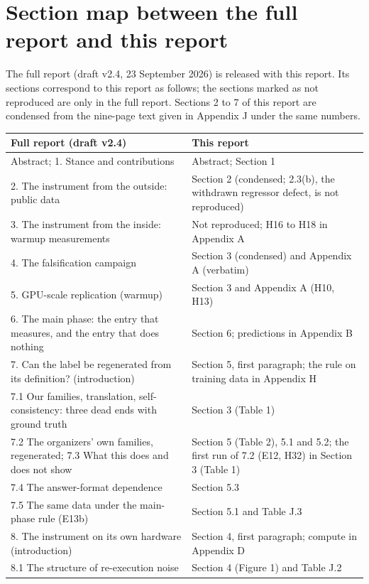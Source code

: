 \section{Section map between the full report and this report}\label{app:E}
The full report (draft v2.4, 23 September 2026) is released with this report. Its sections correspond to this report as follows; the sections marked as not reproduced are only in the full report. Sections 2 to 7 of this report are condensed from the nine-page text given in Appendix J under the same numbers.

\begin{center}\small\setlength{\tabcolsep}{4pt}
\begin{tabular}{L{7.4cm}L{5.8cm}}
\toprule
\textbf{Full report (draft v2.4)} & \textbf{This report} \\
\midrule
Abstract; 1. Stance and contributions & Abstract; Section 1 \\
2. The instrument from the outside: public data & Section 2 (condensed; 2.3(b), the withdrawn regressor defect, is not reproduced) \\
3. The instrument from the inside: warmup measurements & Not reproduced; H16 to H18 in Appendix A \\
4. The falsification campaign & Section 3 (condensed) and Appendix A (verbatim) \\
5. GPU-scale replication (warmup) & Section 3 and Appendix A (H10, H13) \\
6. The main phase: the entry that measures, and the entry that does nothing & Section 6; predictions in Appendix B \\
7. Can the label be regenerated from its definition? (introduction) & Section 5, first paragraph; the rule on training data in Appendix H \\
7.1 Our families, translation, self-consistency: three dead ends with ground truth & Section 3 (Table 1) \\
7.2 The organizers' own families, regenerated; 7.3 What this does and does not show & Section 5 (Table 2), 5.1 and 5.2; the first run of 7.2 (E12, H32) in Section 3 (Table 1) \\
7.4 The answer-format dependence & Section 5.3 \\
7.5 The same data under the main-phase rule (E13b) & Section 5.1 and Table J.3 \\
8. The instrument on its own hardware (introduction) & Section 4, first paragraph; compute in Appendix D \\
8.1 The structure of re-execution noise & Section 4 (Figure 1) and Table J.2 \\

\end{tabular}
\end{center}
